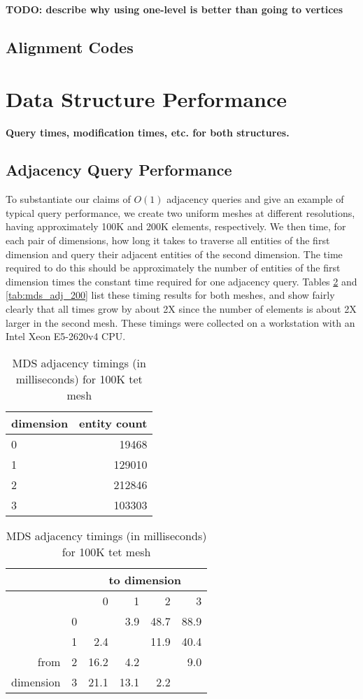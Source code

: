 {\bf TODO: describe why using one-level is better than going to vertices}

\subsection{Alignment Codes}

\section{Data Structure Performance}

{\bf Query times, modification times, etc. for both structures.}

\subsection{Adjacency Query Performance}
\label{sec:adj_perf}

To substantiate our claims of $O(1)$ adjacency queries and
give an example of typical query performance, we create two
uniform meshes at different resolutions, having approximately
100K and 200K elements, respectively.
We then time, for each pair of dimensions, how long it takes
to traverse all entities of the first dimension and query their
adjacent entities of the second dimension.
The time required to do this should be approximately the number
of entities of the first dimension times the constant time
required for one adjacency query.
Tables \ref{tab:mds_adj_100} and \ref{tab:mds_adj_200} list these timing
results for both meshes, and show fairly clearly that all times
grow by about 2X since the number of elements is about 2X larger
in the second mesh.
These timings were collected on a workstation with an Intel Xeon E5-2620v4 CPU.

\begin{table}
\caption{MDS adjacency timings (in milliseconds) for 100K tet mesh}
\label{tab:mds_adj_100}
\begin{center}
\begin{tabular}{l|r|}
dimension & entity count \\\hline
0 & 19468 \\
1 & 129010 \\
2 & 212846 \\
3 & 103303 \\
\end{tabular}
\begin{tabular}{|r|r|r r r r}
               &   & \multicolumn{4}{c}{to dimension} \\\hline
               &   &    0 &    1 &    2 &   3  \\\hline
               & 0 &      &  3.9 & 48.7 & 88.9 \\
               & 1 &  2.4 &      & 11.9 & 40.4 \\
from           & 2 & 16.2 &  4.2 &      &  9.0 \\
dimension      & 3 & 21.1 & 13.1 &  2.2 &      \\
\end{tabular}
\end{center}
\end{table}

